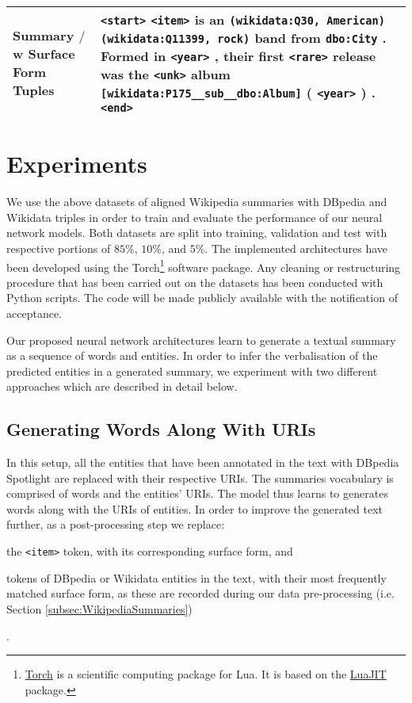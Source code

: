 \documentclass[preprint,5p]{elsarticle}
\begin{document}
\begin{table*}[h]
\begin{center}
\begin{tabular}{|R{3cm}||L{14cm}|}
      \textbf{Summary $/$w Surface Form Tuples} & {\texttt{<start>} \texttt{<item>} is an \texttt{(wikidata:Q30, American)} \texttt{(wikidata:Q11399, rock)} band from \texttt{dbo:City} . Formed in \texttt{<year>} , their first \texttt{<rare>} release was the \texttt{<unk>} album \texttt{[wikidata:P175\_\_sub\_\_dbo:Album]} ( \texttt{<year>} ) . \texttt{<end>}} \\ \hline
  
      
    \end{tabular}
    \label{table:TriplesSummariesDatasetAlignment}
  \end{center}
  
\end{table*}




\section{Experiments}
\label{sec:Experiments}
We use the above datasets of aligned Wikipedia summaries with DBpedia and Wikidata triples in order to train and evaluate the performance of our neural network models. Both datasets are split into training, validation and test with respective portions of $85\%$, $10\%$, and $5\%$. The implemented architectures have been developed using the Torch\footnote{\href{http://torch.ch}{Torch} is a scientific computing package for Lua. It is based on the \href{http://luajit.org/}{LuaJIT} package.} software package. Any cleaning or restructuring procedure that has been carried out on the datasets has been conducted with Python scripts. The code will be made publicly available with the notification of acceptance.


Our proposed neural network architectures learn to generate a textual summary as a sequence of words and entities. In order to infer the verbalisation of the predicted entities in a generated summary, we experiment with two different approaches which are described in detail below.


\subsection{Generating Words Along With URIs}
\label{subsec:GenerateWithURIs}
In this setup, all the entities that have been annotated in the text with DBpedia Spotlight are replaced with their respective URIs. The summaries vocabulary is comprised of words and the entities' URIs. The model thus learns to generates words along with the URIs of entities. In order to improve the generated text further, as a post-processing step we replace:\begin{inparaenum}[(i)]\item the \texttt{<item>} token, with its corresponding surface form, and \item tokens of DBpedia or Wikidata entities in the text, with their most frequently matched surface form, as these are recorded during our data pre-processing (i.e. Section \ref{subsec:WikipediaSummaries})\end{inparaenum}.
\end{document}
